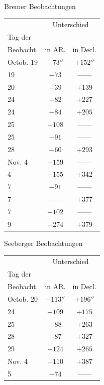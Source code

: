 \begin{center}Bremer Beobachtungen\end{center}
\begin{center}\fontsize{10}{12}\selectfont\setlength{\tabcolsep}{8pt}\renewcommand{\arraystretch}{1.15}\begin{tabular}{l|c|c}
& \multicolumn{2}{c}{Unterschied} \\
Tag der & & \\
Beobacht. & in AR. & in Decl. \\ \hline
Octob. 19 & $-73''$ 
 & $+152''$ \\
19 & $-73$ & ---\;--- \\
20 & $-39$ & $+139$ \\
24 & $-82$ & $+227$ \\
24 & $-84$ & $+205$ \\
25 & $-108$ & ---\;--- \\
25 & $-91$ & ---\;--- \\
28 & $-60$ & $+293$ \\
Nov. 4 & $-159$ & ---\;--- \\
4 & $-155$ & $+342$ \\
7 & $-91$ & ---\;--- \\
7 & ---\;--- & $+377$ \\
7 & $-102$ & ---\;--- \\
9 & $-274$ & $+379$ \\
\end{tabular}\end{center}
\begin{center}Seeberger Beobachtungen\end{center}
\begin{center}\fontsize{10}{12}\selectfont\setlength{\tabcolsep}{8pt}\renewcommand{\arraystretch}{1.15}\begin{tabular}{l|c|c}
& \multicolumn{2}{c}{Unterschied} \\
Tag der & & \\
Beobacht. & in AR. & in Decl. \\ \hline
Octob. 20 & $-113''$ & $+196''$ \\
24 & $-109$ & $+175$ \\
25 & $-88$ & $+263$ \\
28 & $-87$ & $+327$ \\
29 & $-124$ & $+265$ \\
Nov. 4 & $-110$ & $+387$ \\
5 & $-74$ & ---\;--- \\
\end{tabular}\end{center}


